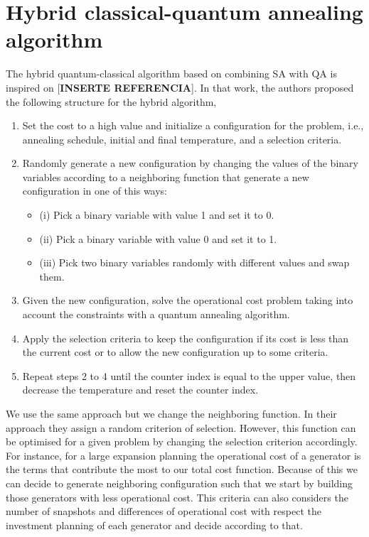\section{Hybrid classical-quantum annealing algorithm}
The hybrid quantum-classical algorithm based on combining SA with QA is inspired on [\textbf{INSERTE REFERENCIA}]. In that work, the authors proposed the following structure for the hybrid algorithm,
\begin{enumerate}
    \item Set the cost to a high value and initialize a configuration for the problem, i.e., annealing schedule, initial and final temperature, and a selection criteria.
    \item Randomly generate a new configuration by changing the values of the binary variables according to a neighboring function that generate a new configuration in one of this ways:
    \begin{itemize}
        \item (i) Pick a binary variable with value 1 and set it to 0.
        \item (ii) Pick a binary variable with value 0 and set it to 1.
        \item (iii) Pick two binary variables randomly with different values and swap them.
    \end{itemize}
    \item Given the new configuration, solve the operational cost problem taking into account the constraints with a quantum annealing algorithm.
    \item Apply the selection criteria to keep the configuration if its cost is less than the current cost or to allow the new configuration up to some criteria.
    \item Repeat steps 2 to 4 until the counter index is equal to the upper value, then decrease the temperature and reset the counter index.
\end{enumerate}
We use the same approach but we change the neighboring function. In their approach they assign a random criterion of selection. However, this function can be optimised for a given problem by changing the selection criterion accordingly. For instance, for a large expansion planning the operational cost of a generator is the terms that contribute the most to our total cost function. Because of this we can decide to generate neighboring configuration such that we start by building those generators with less operational cost. This criteria can also considers the number of snapshots and differences of operational cost with respect the investment planning of each generator and decide according to that. 
